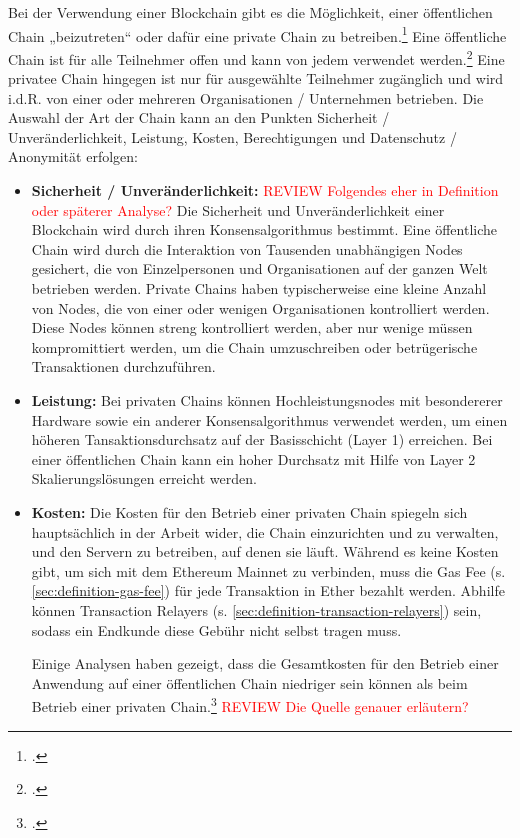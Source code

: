 Bei der Verwendung einer Blockchain gibt es die Möglichkeit, einer öffentlichen Chain „beizutreten“ oder dafür eine private Chain zu betreiben.\footcite[Vgl.][]{w10}
Eine öffentliche Chain ist für alle Teilnehmer offen und kann von jedem verwendet werden.\footcite[Vgl. hierzu und im Folgenden][]{w11}
Eine privatee Chain hingegen ist nur für ausgewählte Teilnehmer zugänglich und wird i.d.R. von einer oder mehreren Organisationen / Unternehmen betrieben.
Die Auswahl der Art der Chain kann an den Punkten Sicherheit / Unveränderlichkeit, Leistung, Kosten, Berechtigungen und Datenschutz / Anonymität erfolgen:
\begin{itemize}
    \item \textbf{Sicherheit / Unveränderlichkeit:} 
    \textcolor{red}{REVIEW Folgendes eher in Definition oder späterer Analyse?}
    Die Sicherheit und Unveränderlichkeit einer Blockchain wird durch ihren Konsensalgorithmus bestimmt. 
    Eine öffentliche Chain wird durch die Interaktion von Tausenden unabhängigen Nodes gesichert, die von Einzelpersonen und Organisationen auf der ganzen Welt betrieben werden. 
    Private Chains haben typischerweise eine kleine Anzahl von Nodes, die von einer oder wenigen Organisationen kontrolliert werden. 
    Diese Nodes können streng kontrolliert werden, aber nur wenige müssen kompromittiert werden, um die Chain umzuschreiben oder betrügerische Transaktionen durchzuführen.

    \item \textbf{Leistung:} 
    Bei privaten Chains können Hochleistungsnodes mit besondererer Hardware sowie ein anderer Konsensalgorithmus verwendet werden, um einen höheren Tansaktionsdurchsatz auf der Basisschicht (Layer 1) erreichen.
    Bei einer öffentlichen Chain kann ein hoher Durchsatz mit Hilfe von Layer 2 Skalierungslösungen erreicht werden.

    \item  \textbf{Kosten:}
    Die Kosten für den Betrieb einer privaten Chain spiegeln sich hauptsächlich in der Arbeit wider, die Chain einzurichten und zu verwalten, und den Servern zu betreiben, auf denen sie läuft. 
    Während es keine Kosten gibt, um sich mit dem Ethereum Mainnet zu verbinden, muss die Gas Fee (s. \ref{sec:definition-gas-fee}) für jede Transaktion in Ether bezahlt werden.
    Abhilfe können Transaction Relayers (s. \ref{sec:definition-transaction-relayers}) sein, sodass ein Endkunde diese Gebühr nicht selbst tragen muss.

    Einige Analysen haben gezeigt, dass die Gesamtkosten für den Betrieb einer Anwendung auf einer öffentlichen Chain niedriger sein können als beim Betrieb einer privaten Chain.\footcite[Vgl.][14]{q6}
    \textcolor{red}{ REVIEW Die Quelle genauer erläutern?}


\end{itemize}
